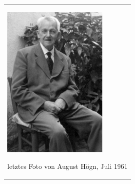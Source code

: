 \begin{center}
\begin{minipage}{5.542cm}
\begin{flushleft}
\tablefirsthead{}
\tablehead{}
\tabletail{}
\tablelasttail{}
\begin{supertabular}{m{5.342cm}}

\includegraphics[width=5.159cm,height=7.606cm]{pictures/zulassungsarbeit-img056.jpg}

letztes Foto von August Högn, Juli
1961\\
\end{supertabular}
\end{flushleft}
\end{minipage}
\end{center}
